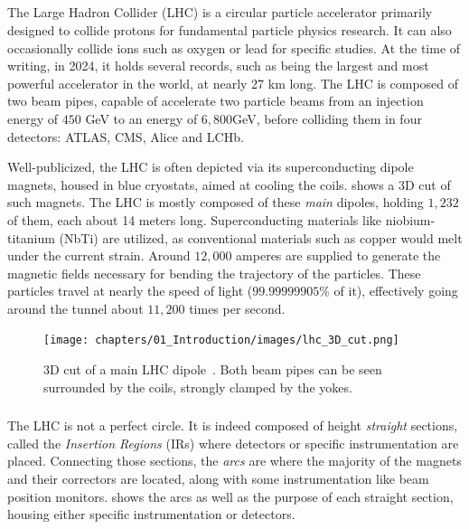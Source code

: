 \subsection{}

The Large Hadron Collider (LHC) is a circular particle accelerator primarily designed to collide
protons for fundamental particle physics research. It can also occasionally collide ions such as
oxygen or lead for specific studies. At the time of writing, in 2024, it holds several records,
such as being the largest and most powerful accelerator in the world, at nearly 27 km long. The LHC
is composed of two beam pipes, capable of accelerate two particle beams from an injection energy
of $450$ GeV to an energy of $6,800$GeV, before colliding them in four detectors: ATLAS, CMS, Alice
and LCHb.

Well-publicized, the LHC is often depicted via its superconducting dipole magnets, housed in blue
cryostats, aimed at cooling the coils.  shows a 3D cut of such magnets. The
LHC is mostly composed of these \textit{main} dipoles, holding $1,232$ of them, each about 14 meters
long. Superconducting materials like niobium-titanium (NbTi) are utilized, as conventional materials
such as copper would melt under the current strain. Around $12,000$ amperes are supplied to generate
the magnetic fields necessary for bending the trajectory of the particles. These particles travel
at nearly the speed of light ($99.99999905\%$ of it), effectively going around the tunnel about
$11,200$ times per second.

\begin{figure}[!htb]
    \centering
    \texttt{[image: chapters/01\_Introduction/images/lhc\_3D\_cut.png]}
    \caption{3D cut of a main LHC dipole~\cite{noauthor_cern_nodate}. Both beam pipes can be seen
    surrounded by the coils, strongly clamped by the yokes.}
    \label{fig:3d_cut_dipole}
\end{figure}


\subsubsection{}

The LHC is not a perfect circle. It is indeed composed of height \textit{straight} sections, called
the \textit{Insertion Regions} (IRs) where detectors or specific instrumentation are placed.
Connecting those sections, the \textit{arcs} are where the majority of the magnets and their
correctors are located, along with some instrumentation like beam position monitors.
 shows the arcs as well as the purpose of each straight section,
housing either specific instrumentation or detectors.

